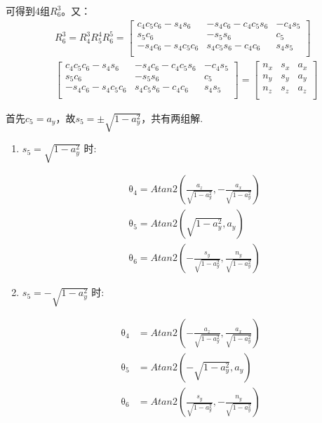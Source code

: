 可得到4组$R_6^3$。又：
\begin{equation}
    \begin{aligned}
        &R_{6}^{3}=R_{4}^{3}R_{5}^{4}R_{6}^{5}=\left[ \begin{matrix}	c_4c_5c_6-s_4s_6&		-s_4c_6-c_4c_5s_6&		-c_4s_5\\	s_5c_6&		-s_5s_6&		c_5\\	-s_4c_6-s_4c_5c_6&		s_4c_5s_6-c_4c_6&		s_4s_5\\\end{matrix} \right] \\
        &\left[ \begin{matrix}	c_4c_5c_6-s_4s_6&		-s_4c_6-c_4c_5s_6&		-c_4s_5\\	s_5c_6&		-s_5s_6&		c_5\\	-s_4c_6-s_4c_5c_6&		s_4c_5s_6-c_4c_6&		s_4s_5\\\end{matrix} \right] =\left[ \begin{matrix}	n_x&		s_x&		a_x\\	n_y&		s_y&		a_y\\	n_z&		s_z&		a_z\\\end{matrix} \right]
    \end{aligned}  
\end{equation}

首先$c_5=a_y$，故$s_5=\pm\sqrt{1-a_y^2}$，共有两组解.

\begin{enumerate}
    \item $s_5=\sqrt{1-a_y^2}$ 时:
    
    \begin{equation}
        \begin{aligned}
            &\mathrm{\theta}_4=Atan2\left( \frac{a_z}{\sqrt{1-a_{y}^{2}}},-\frac{a_x}{\sqrt{1-a_{y}^{2}}} \right)\\
            & \mathrm{\theta}_5=Atan2\left( \sqrt{1-a_{y}^{2}},a_y \right) \\
            & \mathrm{\theta}_6=Atan2\left( -\frac{s_y}{\sqrt{1-a_{y}^{2}}},\frac{n_y}{\sqrt{1-a_{y}^{2}}} \right)
        \end{aligned}
    \end{equation}

    \item $s_5=-\sqrt{1-a_y^2}$ 时:
    
    \begin{equation}
        \begin{aligned}
            \mathrm{\theta}_4&=Atan2\left( -\frac{a_z}{\sqrt{1-a_{y}^{2}}},\frac{a_x}{\sqrt{1-a_{y}^{2}}} \right)\\
            \mathrm{\theta}_5&=Atan2\left( -\sqrt{1-a_{y}^{2}},a_y \right)\\
            \mathrm{\theta}_6&=Atan2\left( \frac{s_y}{\sqrt{1-a_{y}^{2}}},-\frac{n_y}{\sqrt{1-a_{y}^{2}}} \right) 
        \end{aligned}
    \end{equation}
\end{enumerate}

